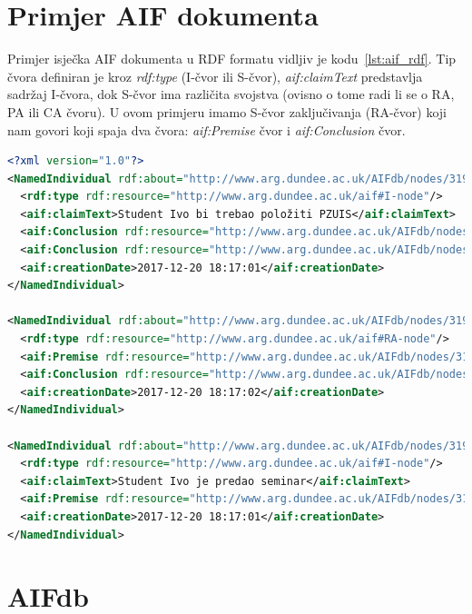 \section{Primjer AIF dokumenta}

Primjer isječka AIF dokumenta u RDF formatu vidljiv je kodu~\ref{lst:aif_rdf}.
Tip čvora definiran je kroz \textit{rdf:type} (I-čvor ili S-čvor),
\textit{aif:claimText} predstavlja sadržaj I-čvora, dok S-čvor ima različita
svojstva (ovisno o tome radi li se o RA, PA ili CA čvoru). 
U ovom primjeru imamo S-čvor zaključivanja (RA-čvor) koji nam govori
koji spaja dva čvora: \textit{aif:Premise} čvor i \textit{aif:Conclusion} čvor. 

\lstset{language=XML}
\begin{lstlisting}[caption={Primjer AIF RDF dokumenta},label={lst:aif_rdf},language=XML, captionpos=b]
<?xml version="1.0"?>
<NamedIndividual rdf:about="http://www.arg.dundee.ac.uk/AIFdb/nodes/319262">
  <rdf:type rdf:resource="http://www.arg.dundee.ac.uk/aif#I-node"/>
  <aif:claimText>Student Ivo bi trebao položiti PZUIS</aif:claimText>
  <aif:Conclusion rdf:resource="http://www.arg.dundee.ac.uk/AIFdb/nodes/319264"/>
  <aif:Conclusion rdf:resource="http://www.arg.dundee.ac.uk/AIFdb/nodes/319266"/>
  <aif:creationDate>2017-12-20 18:17:01</aif:creationDate>
</NamedIndividual>

<NamedIndividual rdf:about="http://www.arg.dundee.ac.uk/AIFdb/nodes/319264">
  <rdf:type rdf:resource="http://www.arg.dundee.ac.uk/aif#RA-node"/>
  <aif:Premise rdf:resource="http://www.arg.dundee.ac.uk/AIFdb/nodes/319263"/>
  <aif:Conclusion rdf:resource="http://www.arg.dundee.ac.uk/AIFdb/nodes/319262"/>
  <aif:creationDate>2017-12-20 18:17:02</aif:creationDate>
</NamedIndividual>

<NamedIndividual rdf:about="http://www.arg.dundee.ac.uk/AIFdb/nodes/319263">
  <rdf:type rdf:resource="http://www.arg.dundee.ac.uk/aif#I-node"/>
  <aif:claimText>Student Ivo je predao seminar</aif:claimText>
  <aif:Premise rdf:resource="http://www.arg.dundee.ac.uk/AIFdb/nodes/319264"/>
  <aif:creationDate>2017-12-20 18:17:01</aif:creationDate>
</NamedIndividual>
\end{lstlisting}


\section{AIFdb}
\label{sec:aifdb}

